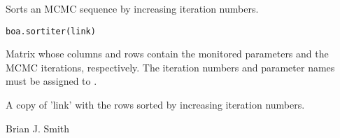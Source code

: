 \begin{Description}\relax
Sorts an MCMC sequence by increasing iteration numbers.
\end{Description}
\begin{Usage}
\begin{verbatim}
boa.sortiter(link)
\end{verbatim}
\end{Usage}
\begin{Arguments}
\begin{ldescription}
\item[\code{link}] Matrix whose columns and rows contain the monitored parameters 
and the MCMC iterations, respectively. The iteration numbers and parameter 
names must be assigned to .
\end{ldescription}
\end{Arguments}
\begin{Value}
A copy of 'link' with the rows sorted by increasing iteration numbers.
\end{Value}
\begin{Author}\relax
Brian J. Smith
\end{Author}
\begin{SeeAlso}\relax
{}
\end{SeeAlso}

